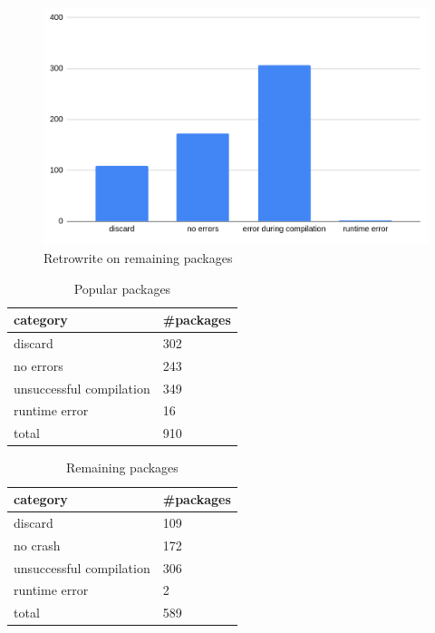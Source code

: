 \documentclass[a4paper,11pt,oneside]{report}
\newcommand{\sysname}{Retrowrite\xspace}
\begin{document}
\begin{figure}[h]
    \centering
    \includegraphics[width=15cm]{remaining_packages.png} 
    \caption{\sysname on remaining packages}
    \label{fig:remaining}
\end{figure}

\begin{table}[h]
    \centering
    \label{table:popular}
    \begin{tabular}{ll}
        \hline
        category                & \#packages \\
        \hline
        discard                  & 302  \\
        no errors                & 243  \\
        unsuccessful compilation & 349  \\
        runtime error            & 16   \\
        total                    & 910  \\ 
        \hline
    \end{tabular}
    \caption{Popular packages}
\end{table}


\begin{table}[h]
    \centering
    \label{table:remaining}
    \begin{tabular}{ll}
        \hline
        category                & \#packages \\
        \hline
        discard                  & 109  \\
        no crash                 & 172  \\
        unsuccessful compilation & 306  \\
        runtime error            & 2    \\
        total                    & 589  \\
        \hline
    \end{tabular}
    \caption{Remaining packages}
\end{table}
\end{document}
